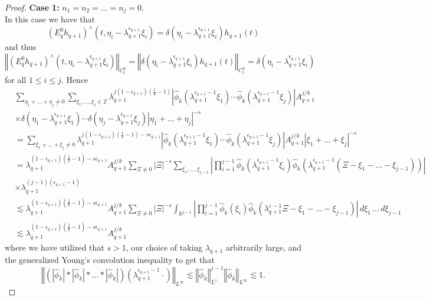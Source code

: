\documentclass[12pt,reqno,letterpaper]{amsart}
\numberwithin{equation}{section}
\newcommand{\1}{{\bf 1}}
\newcommand{\2}{{\bf 2}}
\newcommand{\R}{\mathbb R}
\newcommand{\Z}{\mathbb Z}
\newcommand{\ep}{\varepsilon}
\theoremstyle{remark}
\theoremstyle{remark}
\begin{document}
\begin{proof}
    \textbf{Case 1:} $n_1 = n_2 = \ldots =n_j = 0$.\\
    In this case we have that
    $$
    \left(E_q^0 h_{q+1}\right)^{\wedge}(t,\eta_i - \lambda_{q+1}^{\epsilon_{q+1}} \xi_i) = \delta(\eta_i - \lambda_{q+1}^{\epsilon_{q+1}} \xi_i) h_{q+1}(t)
    $$
    and thus
    $$
    \left\Vert \left(E_q^{0} h_{q+1}\right)^{\wedge}(t,\eta_i - \lambda_{q+1}^{\epsilon_{q+1}} \xi_i) \right\Vert_{C_t^0} = \left\Vert \delta(\eta_i - \lambda_{q+1}^{\epsilon_{q+1}} \xi_i) h_{q+1}(t) \right\Vert_{C_t^0} = \delta(\eta_i - \lambda_{q+1}^{\epsilon_{q+1}} \xi_i)
    $$
    for all $1 \leq i \leq j$. Hence
    \begin{equation}\label{eq:n=0_case}
        \begin{split}
            &\sum_{\eta_1 + \ldots + \eta_j \not=0} \sum_{\xi_1,\ldots,\xi_j \in \Z} \lambda_{q+1}^{j(1-\epsilon_{q+1})\left(\frac{1}{k} - 1\right)} \left|\hat{\phi}_k\left(\lambda_{q+1}^{\epsilon_{q+1}-1}\xi_1\right) \cdots \hat{\phi}_k\left(\lambda_{q+1}^{\epsilon_{q+1}-1}\xi_j\right)\right| A_{q+1}^{j/k}\\
            &\times \delta(\eta_1 - \lambda_{q+1}^{\epsilon_{q+1}} \xi_1) \cdots \delta(\eta_j - \lambda_{q+1}^{\epsilon_{q+1}} \xi_j) |\eta_1 + \ldots + \eta_j|^{-s}\\
            &= \sum_{\xi_1 + \ldots + \xi_j \not=0} \lambda_{q+1}^{j(1-\epsilon_{q+1})\left(\frac{1}{k}-1\right) - s\epsilon_{q+1}} \left| \hat{\phi}_k\left(\lambda_{q+1}^{\epsilon_{q+1}-1}\xi_1\right) \cdots \hat{\phi}_k\left(\lambda_{q+1}^{\epsilon_{q+1}-1}\xi_j\right)\right| A_{q+1}^{j/k} |\xi_1 + \ldots + \xi_j|^{-s}\\
            &= \lambda_{q+1}^{(1-\epsilon_{q+1})\left(\frac{j}{k}-1\right)-s\epsilon_{q+1}} A_{q+1}^{j/k} \sum_{\Xi \not=0} |\Xi|^{-s} \sum_{\xi_1,\ldots,\xi_{j-1}} \left|\prod_{i=1}^{j-1}\hat{\phi}_k\left(\lambda_{q+1}^{\epsilon_{q+1}-1}\xi_i\right) \hat{\phi}_k\left(\lambda_{q+1}^{\epsilon_{q+1}-1}\left(\Xi - \xi_1 - \ldots - \xi_{j-1}\right)\right)\right|\\
            &\times \lambda_{q+1}^{(j-1)(\epsilon_{q+1}-1)}\\
            &\lesssim \lambda_{q+1}^{(1-\epsilon_{q+1})\left(\frac{j}{k}-1\right)-s\epsilon_{q+1}} A_{q+1}^{j/k} \sum_{\Xi \not=0} |\Xi|^{-s} \int_{\R^{j-1}} \left| \prod_{i=1}^{j-1} \hat{\phi}_k(\xi_i) \hat{\phi}_k(\lambda_{q+1}^{\ep -1}\Xi - \xi_1 - \ldots - \xi_{j-1})\right|\, d\xi_1\, \ldots\, d\xi_{j-1}\\
            &\lesssim \lambda_{q+1}^{(1-
            \epsilon_{q+1})\left(\frac{j}{k}-1\right)-s\epsilon_{q+1}} A_{q+1}^{j/k}
        \end{split}
    \end{equation}
    where we have utilized that $s > 1$, our choice of taking $\lambda_{q+1}$ arbitrarily large, and the generalized Young's convolution inequality to get that
    $$
    \left\Vert \left(|\hat{\phi}_k| \ast |\hat{\phi}_k| \ast \ldots \ast |\hat{\phi}_k|\right)\left(\lambda_{q+1}^{\epsilon_{q+1}-1} \cdot\right)\right\Vert_{L^\infty} \lesssim \left\Vert \hat{\phi}_k\right\Vert_{L^1}^{j-1} \left\Vert \hat{\phi}_k \right\Vert_{L^\infty} \lesssim 1.
    $$


\end{proof}
\end{document}
